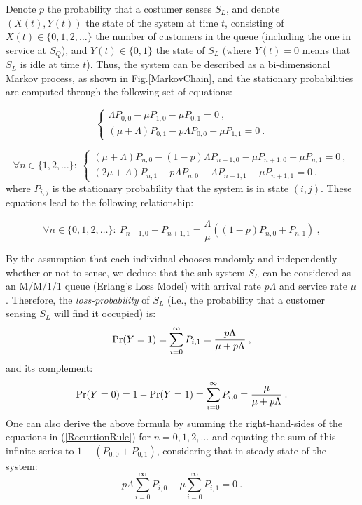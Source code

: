 \documentclass[11pt]{article}
\numberwithin{equation}{section}
\newcommand{\pr}{{\rm Pr}}
\begin{document}
Denote $p$ the probability that a costumer senses $S_L$, and denote $(X(t), Y(t))$ the state of the system at time $t$, consisting of $X(t) \in \lbrace0, 1, 2, \ldots\rbrace$ the number of customers in the queue (including the one in service at $S_Q$), and $Y(t) \in \lbrace0, 1\rbrace$ the state of $S_L$ (where $Y(t)=0$ means that $S_L$ is idle at time $t$). Thus, the system can be described as a bi-dimensional Markov process, as shown in Fig.\ref{MarkovChain}, and the stationary probabilities are computed through the following set of equations: 

\begin{equation}
  \begin{cases}
    \Lambda P_{0,0} - \mu P_{1,0}  - \mu P_{0,1} = 0\:,\\
    (\mu+\Lambda) P_{0,1} - p\Lambda P_{0,0}  - \mu P_{1,1} = 0\:.
  \end{cases}
	\label{StateEq1}
\end{equation}

\begin{equation}
  \forall n \in \lbrace 1, 2, \ldots \rbrace: \ \begin{cases}
    (\mu+\Lambda) P_{n,0} - (1-p) \Lambda P_{n-1, 0} - \mu P_{n+1,0}  - \mu P_{n,1} = 0\:,\\
    (2\mu+\Lambda) P_{n,1} - p\Lambda P_{n,0}  - \Lambda P_{n-1,1} - \mu P_{n+1,1} = 0\:.
  \end{cases} \label{StateEq2}
\end{equation}
where $P_{i,j}$ is the stationary probability that the system is in state $(i,j)$. These equations lead to the following relationship:

\begin{equation}
  \forall n \in \lbrace 0, 1, 2, \ldots \rbrace: \ 
    P_{n+1,0} + P_{n+1,1} = \dfrac{\Lambda}{\mu}((1-p) P_{n,0} + P_{n, 1})\:, \label{RecurtionRule}
\end{equation}

By the assumption that each individual chooses randomly and independently whether or not to sense, we deduce that the sub-system $S_L$ can be considered as an M/M/1/1 queue (Erlang's Loss Model) with arrival rate $p\Lambda$ and service rate $\mu$. Therefore, the {\it loss-probability} of $S_L$ (i.e., the probability that a customer sensing $S_L$ will find it occupied) is:
\begin{equation}
	\pr(Y=1) = \sum\limits_{i=0}^{\infty} P_{i, 1} = \dfrac{p\Lambda}{\mu+p\Lambda}\:, \label{LossProb}
\end{equation}
and its complement:
\begin{equation}
	\pr(Y=0) = 1-\pr(Y=1) = \sum\limits_{i=0}^{\infty} P_{i, 0} = \dfrac{\mu}{\mu+p\Lambda}\:. \label{OMLossProb}
\end{equation}
One can also derive the above formula by summing the right-hand-sides of the equations in (\ref{RecurtionRule}) for $n=0,1,2,\ldots$ and equating the sum of this infinite series to $1-(P_{0,0}+P_{0,1})$, considering that in steady state of the system: \[ p\Lambda\sum_{i=0}^{\infty}P_{i,0} - \mu \sum_{i=0}^{\infty}P_{i,1} = 0\:.\]
\end{document}
